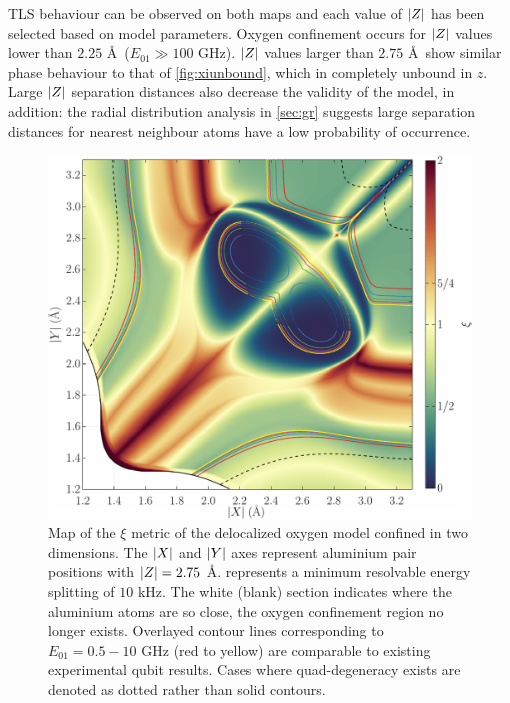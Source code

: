TLS behaviour can be observed on both maps and each value of $\lvert Z\rvert$ has been selected based on model parameters.
Oxygen confinement occurs for $\lvert Z\rvert$ values lower than $2.25$ \AA\ (\ie $E_{01} \gg 100$ GHz).
$\lvert Z\rvert$ values larger than $2.75$ \AA\ show similar phase behaviour to that of \cref{fig:xiunbound}, which in completely unbound in $z$.
Large $\lvert Z\rvert$ separation distances also decrease the validity of the  model, in addition: the radial distribution analysis in \cref{sec:gr} suggests large separation distances for nearest neighbour atoms have a low probability of occurrence.

\begin{figure}[htp]
  \includegraphics[width=\textwidth]{figures/xi275}
  \caption[$\xi$ Metric Phase Map, With $\abs{Z} = 2.75$ \AA]{\label{fig:xi275}Map of the $\xi$ metric of the delocalized oxygen model confined in two dimensions. The $\lvert X\rvert$ and $\lvert Y\rvert$ axes represent aluminium pair positions with $\abs{Z} = 2.75$ \AA.  represents a minimum resolvable energy splitting of $10$ kHz. The white (blank) section indicates where the aluminium atoms are so close, the oxygen confinement region no longer exists. Overlayed contour lines corresponding to $E_{01} = 0.5\!-\!10$ GHz (red to yellow) are comparable to existing experimental qubit results. Cases where quad-degeneracy exists are denoted as dotted rather than solid contours.}
\end{figure}

